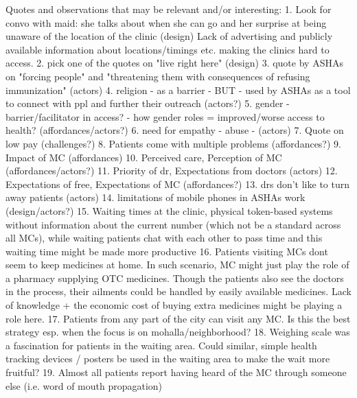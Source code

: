 Quotes and observations that may be relevant and/or interesting:
1. Look for convo with maid: she talks about when she can go and her surprise at being unaware of the location of the clinic (design)
Lack of advertising and publicly available information about locations/timings etc.  making the clinics hard to access.
2. pick one of the quotes on "live right here" (design)
3. quote by ASHAs on "forcing people" and "threatening them with consequences of refusing immunization" (actors)
4. religion - as a barrier - BUT - used by ASHAs as a tool to connect with ppl and further their outreach (actors?)
5. gender - barrier/facilitator in access? - how gender roles = improved/worse access to health? (affordances/actors?)
6. need for empathy - abuse - (actors) 
7. Quote on low pay (challenges?)
8. Patients come with multiple problems (affordances?)
9. Impact of MC (affordances)
10. Perceived care, Perception of MC (affordances/actors?)
11. Priority of dr, Expectations from doctors (actors)
12. Expectations of free, Expectations of MC (affordances?)
13. drs don't like to turn away patients (actors)
14. limitations of mobile phones in ASHAs work (design/actors?)
15. Waiting times at the clinic, physical token-based systems without information about the current number (which not be a standard across all MCs), while waiting patients chat with each other to pass time and this waiting time might be made more productive
16. Patients visiting MCs dont seem to keep medicines at home. In such scenario, MC might just play the role of a pharmacy supplying OTC medicines. Though the patients also see the doctors in the process, their ailments could be handled by easily available medicines. Lack of knowledge + the economic cost of buying extra medicines might be playing a role here.
17. Patients from any part of the city can visit any MC. Is this the best strategy esp. when the focus is on mohalla/neighborhood?
18. Weighing scale was a fascination for patients in the waiting area. Could similar, simple health tracking devices / posters be used in the waiting area to make the wait more fruitful?
19. Almost all patients report having heard of the MC through someone else (i.e. word of mouth propagation)
